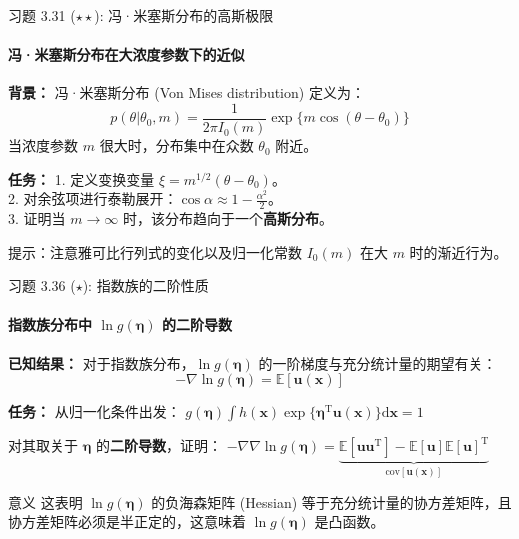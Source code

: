 \documentclass[12pt, aspectratio=169]{beamer}
\newcommand{\vect}[1]{\mathbf{#1}}
\newcommand{\mat}[1]{\mathbf{#1}}
\newcommand{\E}{\mathbb{E}}
\begin{document}
\begin{frame}{习题 3.31 ($\star\star$): 冯·米塞斯分布的高斯极限}
    \framesubtitle{冯·米塞斯分布在大浓度参数下的近似}
    
    \textbf{背景：}
    冯·米塞斯分布 (Von Mises distribution) 定义为：
    \begin{equation*}
        p(\theta|\theta_0,m) = \frac{1}{2\pi I_0(m)}\exp\{m\cos(\theta-\theta_0)\}
    \end{equation*}
    当浓度参数 $m$ 很大时，分布集中在众数 $\theta_0$ 附近。
    
    \vspace{1em}
    \textbf{任务：}
    1. 定义变换变量 $\xi = m^{1/2}(\theta - \theta_0)$。\\
    2. 对余弦项进行泰勒展开：$\cos \alpha \approx 1 - \frac{\alpha^2}{2}$。\\
    3. 证明当 $m \to \infty$ 时，该分布趋向于一个\textbf{高斯分布}。
    
    \vspace{1em}
    \footnotesize{提示：注意雅可比行列式的变化以及归一化常数 $I_0(m)$ 在大 $m$ 时的渐近行为。}
\end{frame}

\begin{frame}{习题 3.36 ($\star$): 指数族的二阶性质}
    \framesubtitle{指数族分布中 $\ln g(\mat{\eta})$ 的二阶导数}
    
    \textbf{已知结果：}
    对于指数族分布，$\ln g(\mat{\eta})$ 的一阶梯度与充分统计量的期望有关：
    \begin{equation*}
        -\nabla\ln g(\mat{\eta})=\E[\mathbf{u}(\vect{x})]
    \end{equation*}
    
    \textbf{任务：}
    从归一化条件出发：
    $\displaystyle g(\mat{\eta})\int h(\vect{x})\exp\{\mat{\eta}^{\mathrm{T}}\mathbf{u}(\vect{x})\}\mathrm{d}\vect{x} = 1
    $

    对其取关于 $\mat{\eta}$ 的\textbf{二阶导数}，证明：
    $\displaystyle
        -\nabla\nabla \ln g(\mat{\eta}) = \underbrace{\E[\mathbf{u}\mathbf{u}^\mathrm{T}] - \E[\mathbf{u}]\E[\mathbf{u}]^\mathrm{T}}_{\text{cov}[\mathbf{u}(\vect{x})]}
    $
    
    \begin{alertblock}{意义}
        这表明 $\ln g(\mat{\eta})$ 的负海森矩阵 (Hessian) 等于充分统计量的协方差矩阵，且协方差矩阵必须是半正定的，这意味着 $\ln g(\mat{\eta})$ 是凸函数。
    \end{alertblock}
\end{frame}
\end{document}

